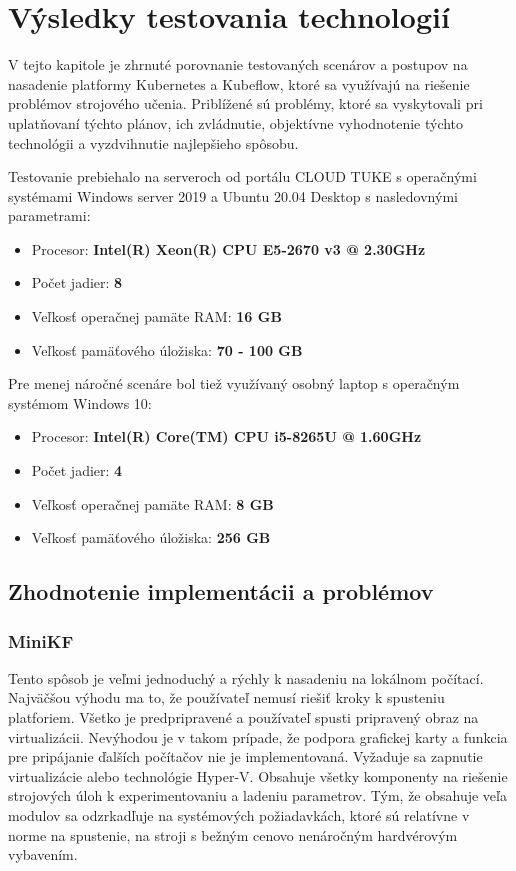 
\chapter{Výsledky testovania technologií}
\label{evaluation}

V tejto kapitole je zhrnuté porovnanie testovaných scenárov a postupov na nasadenie platformy Kubernetes a Kubeflow, ktoré sa využívajú na riešenie problémov strojového učenia. Priblížené sú problémy, ktoré sa vyskytovali pri uplatňovaní týchto plánov, ich zvládnutie, objektívne vyhodnotenie týchto technológii a vyzdvihnutie najlepšieho spôsobu.

Testovanie prebiehalo na serveroch od portálu CLOUD TUKE s operačnými systémami Windows server 2019 a Ubuntu 20.04 Desktop s nasledovnými parametrami:

\begin{itemize}
	\item Procesor: \textbf{Intel(R) Xeon(R) CPU E5-2670 v3 @ 2.30GHz}
	\item Počet jadier: \textbf{8}
    \item Veľkosť operačnej pamäte RAM: \textbf{16 GB}
    \item Veľkosť pamäťového úložiska: \textbf{70 - 100 GB}
\end{itemize}

Pre menej náročné scenáre bol tiež využívaný osobný laptop s operačným systémom Windows 10:

\begin{itemize}
	\item Procesor: \textbf{Intel(R) Core(TM) CPU i5-8265U @ 1.60GHz}
	\item Počet jadier: \textbf{4}
    \item Veľkosť operačnej pamäte RAM: \textbf{8 GB}
    \item Veľkosť pamäťového úložiska: \textbf{256 GB}
\end{itemize}

\section{Zhodnotenie implementácii a problémov}

\subsection*{MiniKF}

Tento spôsob je veľmi jednoduchý a rýchly k nasadeniu na lokálnom počítací. Najväčšou výhodu ma to, že používateľ nemusí riešiť kroky k spusteniu platforiem. Všetko je predpripravené a používateľ spusti pripravený obraz na virtualizácii. Nevýhodou je v takom prípade, že podpora grafickej karty a funkcia pre pripájanie ďalších počítačov nie je implementovaná. Vyžaduje sa zapnutie virtualizácie alebo technológie Hyper-V. Obsahuje všetky komponenty na riešenie strojových úloh k experimentovaniu a ladeniu parametrov. Tým, že obsahuje veľa modulov sa odzrkadľuje na systémových požiadavkách, ktoré sú relatívne v norme na spustenie, na stroji s bežným cenovo nenáročným hardvérovým vybavením.

